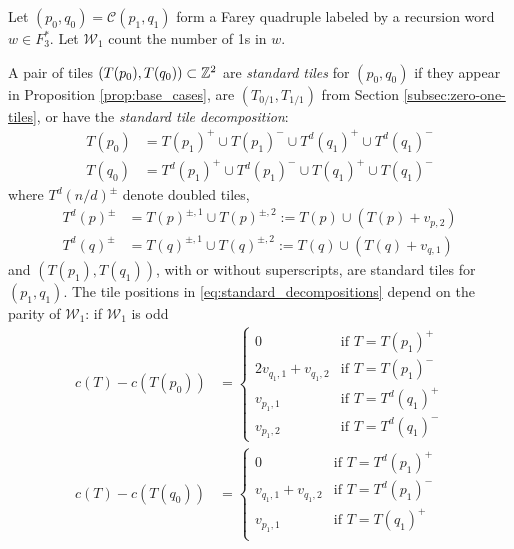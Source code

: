 \documentclass[12pt]{amsart}
\begin{document}
Let $(p_0, q_0) =  \mathcal{C}(p_1,q_1)$ form a Farey quadruple labeled by a recursion word $w \in F_3^*$. Let $\mathcal{W}_1$ count the number of 1s in $w$.

\begin{definition}  \label{def:standard_tiles}
	
	
	A pair of tiles $(T(p_0), T(q_0)) \subset \mathbb{Z}^2$ are {\it standard tiles} for $(p_0, q_0)$ if
	they appear in Proposition \ref{prop:base_cases}, are $(T_{0/1}, T_{1/1})$ from Section \ref{subsec:zero-one-tiles}, or 
	have the {\it standard tile decomposition}:
	\begin{equation} \label{eq:standard_decompositions}
	\begin{aligned}
	T(p_0) &= T(p_1)^+ \cup T(p_1)^- \cup T^d(q_1)^+ \cup T^d(q_1)^- \\
	T(q_0) &=  T^d(p_1)^+ \cup T^d(p_1)^- \cup T(q_1)^+ \cup T(q_1)^- 
	\end{aligned}
	\end{equation}
	where $T^d(n/d)^{\pm}$ denote doubled tiles, 
	\begin{equation} \label{eq:doubled_tiles}
	\begin{aligned}
	T^d(p)^{\pm} &= T(p)^{\pm,1} \cup T(p)^{\pm, 2} := T(p) \cup (T(p) +  v_{p,2}) \\
	T^d(q)^{\pm} &= T(q)^{\pm,1} \cup T(q)^{\pm, 2} := T(q) \cup (T(q)+ v_{q,1}) 
	\end{aligned}
	\end{equation} 
	and $(T(p_1), T(q_1))$, with or without superscripts, are standard tiles for $(p_1,q_1)$.
	The tile positions
	in \eqref{eq:standard_decompositions} depend on the parity of $\mathcal{W}_1$: 
	if $\mathcal{W}_1$ is odd
	\begin{equation} \label{eq:offsets_w1_odd}
	\begin{aligned}
	c(T) - c(T(p_0)) &= 
	\begin{cases}
	0 &\mbox{if $T = T(p_1)^+$} \\
	2 v_{q_1,1} + v_{q_1,2} &\mbox{if $T = T(p_1)^-$} \\
	v_{p_1,1} &\mbox{if $T = T^d(q_1)^+$} \\
	v_{p_1,2} &\mbox{if $T = T^d(q_1)^-$} 
	\end{cases} \\
	c(T) - c(T(q_0))  &= 
	\begin{cases}
	0 &\mbox{if $T = T^d(p_1)^+$} \\
	v_{q_1,1} + v_{q_1,2} &\mbox{if $T = T^d(p_1)^-$} \\
	v_{p_1,1} &\mbox{if $T = T(q_1)^+$} \\

\end{cases}
\end{aligned}
\end{equation}
\end{definition}
\end{document}
